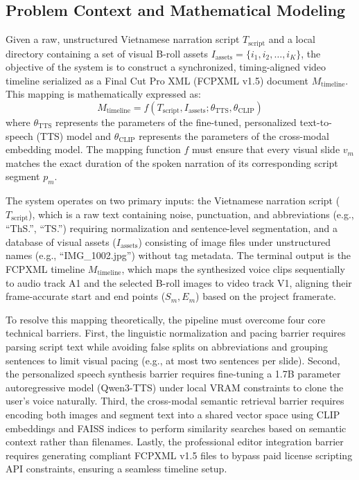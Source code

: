 \documentclass[a4paper,12pt]{report}
\begin{document}
\subsection{Problem Context and Mathematical Modeling}
Given a raw, unstructured Vietnamese narration script $T_{\text{script}}$ and a local directory containing a set of visual B-roll assets $I_{\text{assets}} = \{i_1, i_2, \dots, i_K\}$, the objective of the system is to construct a synchronized, timing-aligned video timeline serialized as a Final Cut Pro XML (FCPXML v1.5) document $M_{\text{timeline}}$. This mapping is mathematically expressed as:
\begin{equation}
    M_{\text{timeline}} = f(T_{\text{script}}, I_{\text{assets}}; \theta_{\text{TTS}}, \theta_{\text{CLIP}})
\end{equation}
where $\theta_{\text{TTS}}$ represents the parameters of the fine-tuned, personalized text-to-speech (TTS) model and $\theta_{\text{CLIP}}$ represents the parameters of the cross-modal embedding model. The mapping function $f$ must ensure that every visual slide $v_m$ matches the exact duration of the spoken narration of its corresponding script segment $p_m$.

The system operates on two primary inputs: the Vietnamese narration script ($T_{\text{script}}$), which is a raw text containing noise, punctuation, and abbreviations (e.g., ``ThS.'', ``TS.'') requiring normalization and sentence-level segmentation, and a database of visual assets ($I_{\text{assets}}$) consisting of image files under unstructured names (e.g., ``IMG\_1002.jpg'') without tag metadata. The terminal output is the FCPXML timeline $M_{\text{timeline}}$, which maps the synthesized voice clips sequentially to audio track A1 and the selected B-roll images to video track V1, aligning their frame-accurate start and end points ($S_m, E_m$) based on the project framerate.

To resolve this mapping theoretically, the pipeline must overcome four core technical barriers. First, the linguistic normalization and pacing barrier requires parsing script text while avoiding false splits on abbreviations and grouping sentences to limit visual pacing (e.g., at most two sentences per slide). Second, the personalized speech synthesis barrier requires fine-tuning a 1.7B parameter autoregressive model (Qwen3-TTS) under local VRAM constraints to clone the user's voice naturally. Third, the cross-modal semantic retrieval barrier requires encoding both images and segment text into a shared vector space using CLIP embeddings and FAISS indices to perform similarity searches based on semantic context rather than filenames. Lastly, the professional editor integration barrier requires generating compliant FCPXML v1.5 files to bypass paid license scripting API constraints, ensuring a seamless timeline setup.
\end{document}
